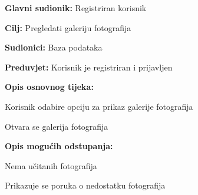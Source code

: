 					\noindent {}
					\begin{packed_item}
						
						\item \textbf{Glavni sudionik: } Registriran korisnik
						\item  \textbf{Cilj:} Pregledati galeriju fotografija
						\item  \textbf{Sudionici:} Baza podataka
						\item  \textbf{Preduvjet:} Korisnik je registriran i prijavljen
						\item  \textbf{Opis osnovnog tijeka:}
						
						\item[] \begin{packed_enum}
							
							\item Korisnik odabire opciju za prikaz galerije fotografija
							\item Otvara se galerija fotografija
						\end{packed_enum}
						
						\item  \textbf{Opis mogućih odstupanja:}
						
						\item[] \begin{packed_item}
							\item[2.a] Nema učitanih fotografija
							\item[] \begin{packed_enum}			
								\item Prikazuje se poruka o nedostatku fotografija
							\end{packed_enum}
						\end{packed_item}
					\end{packed_item}
					
